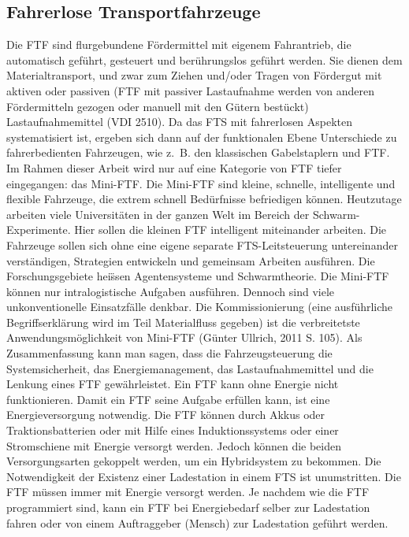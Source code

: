 \begin{itemize}
\subsection{Fahrerlose Transportfahrzeuge}
Die FTF sind flurgebundene F\"ordermittel mit eigenem Fahrantrieb, die automatisch gef\"uhrt, gesteuert und ber\"uhrungslos gef\"uhrt werden. Sie dienen dem Materialtransport, und zwar zum Ziehen und/oder Tragen von F\"ordergut mit aktiven oder passiven (FTF mit passiver Lastaufnahme werden von anderen F\"ordermitteln gezogen oder manuell mit den G\"utern best\"uckt) Lastaufnahmemittel (VDI 2510). Da das FTS mit fahrerlosen Aspekten systematisiert ist, ergeben sich dann auf der funktionalen Ebene Unterschiede zu fahrerbedienten Fahrzeugen, wie z.~B. den klassischen Gabelstaplern und FTF. Im Rahmen dieser Arbeit wird nur auf eine Kategorie von FTF tiefer eingegangen: das Mini-FTF. Die Mini-FTF sind kleine, schnelle, intelligente und flexible Fahrzeuge, die extrem schnell Bed\"urfnisse befriedigen k\"onnen. Heutzutage arbeiten viele Universit\"aten in der ganzen Welt im Bereich der Schwarm-Experimente. Hier sollen die kleinen FTF intelligent miteinander arbeiten. Die Fahrzeuge sollen sich ohne eine eigene separate FTS-Leitsteuerung untereinander verst\"andigen, Strategien entwickeln und gemeinsam Arbeiten ausf\"uhren. Die Forschungsgebiete hei\"ssen Agentensysteme und Schwarmtheorie. Die Mini-FTF k\"onnen nur intralogistische Aufgaben ausf\"uhren. Dennoch sind viele unkonventionelle Einsatzf\"alle denkbar. Die Kommissionierung (eine ausf\"uhrliche Begriffserkl\"arung wird im Teil Materialfluss gegeben) ist die verbreitetste Anwendungsm\"oglichkeit von Mini-FTF (G\"unter Ullrich, 2011 S. 105).
Als Zusammenfassung kann man sagen, dass die Fahrzeugsteuerung die Systemsicherheit, das Energiemanagement, das Lastaufnahmemittel und die Lenkung eines FTF gew\"ahrleistet. Ein FTF kann ohne Energie nicht funktionieren. Damit ein FTF seine Aufgabe erf\"ullen kann, ist eine Energieversorgung notwendig. Die FTF können durch Akkus oder Traktionsbatterien oder mit Hilfe eines Induktionssystems oder einer Stromschiene mit Energie versorgt werden. Jedoch k\"onnen die beiden Versorgungsarten gekoppelt werden, um ein Hybridsystem zu bekommen. Die Notwendigkeit der Existenz einer Ladestation in einem FTS ist unumstritten. Die FTF m\"ussen immer mit Energie versorgt werden. Je nachdem wie die FTF programmiert sind, kann ein FTF bei Energiebedarf selber zur Ladestation fahren oder von einem Auftraggeber (Mensch) zur Ladestation gef\"uhrt werden.


\end{itemize}
